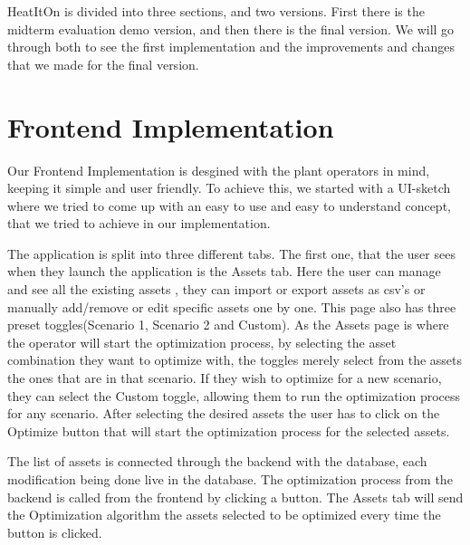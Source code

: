 

\noindent\hspace*{1cm} HeatItOn is divided into three sections, and two versions. First there is the midterm evaluation demo version, and then there is the final version. We will go through both to see the first implementation and the improvements and changes that we made for the final version. 

\section{Frontend Implementation}

\hspace*{1cm}Our Frontend Implementation is desgined with the plant operators in mind, keeping it simple and user friendly. To achieve this, we started with a UI-sketch where we tried to come up with an easy to use and easy to understand concept, that we tried to achieve in our implementation.
 	
\hspace*{1cm}The application is split into three different tabs. The first one, that the user sees when they launch the application is the Assets tab. Here the user can manage and see all the existing assets \cite{projectassetsdata}, they can import or export assets as csv's or manually add/remove or edit specific assets one by one. This page also has three preset toggles(Scenario 1, Scenario 2 and Custom). As the Assets page is where the operator will start the optimization process, by selecting the asset combination they want to optimize with, the toggles merely select from the assets the ones that are in that scenario. If they wish to optimize for a new scenario, they can select the Custom toggle, allowing them to run the optimization process for any scenario. After selecting the desired assets the user has to click on the Optimize button that will start the optimization process for the selected assets. 
	
\hspace*{1cm}The list of assets is connected through the backend with the database, each modification being done live in the database. The optimization process from the backend is called from the frontend by clicking a button. The Assets tab will send the Optimization algorithm the assets selected to be optimized every time the button is clicked.
	

